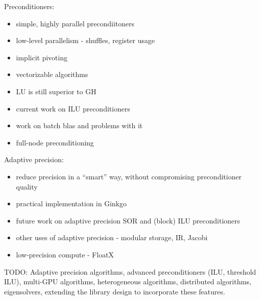 

Preconditioners:
\begin{itemize}
    \item simple, highly parallel precondiitoners
    \item low-level parallelism - shuffles, register usage
    \item implicit pivoting
    \item vectorizable algorithms
    \item LU is still superior to GH
    \item current work on ILU preconditioners
    \item work on batch blas and problems with it
    \item full-node preconditioning
\end{itemize}

Adaptive precision:
\begin{itemize}
    \item reduce precision in a ``smart'' way, without compromising
          preconditioner quality
    \item practical implementation in Ginkgo
    \item future work on adaptive precision SOR and (block) ILU preconditioners
    \item other uses of adaptive precision - modular storage, IR, Jacobi
    \item low-precision compute - FloatX
\end{itemize}

TODO: Adaptive precision algorithms, advanced preconditioners (ILU, threshold
ILU), multi-GPU algorithms, heterogeneous algorithms, distributed algorithms,
eigensolvers, extending the library design to incorporate these features.


